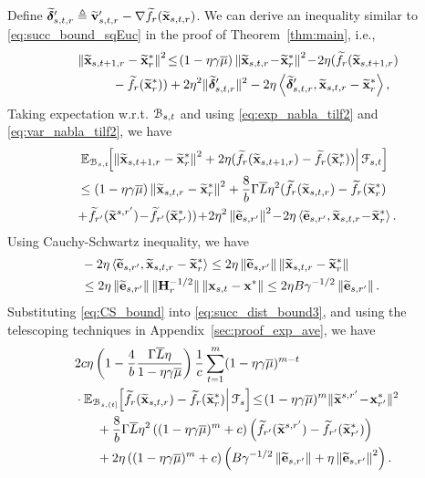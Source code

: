 \documentclass[10pt,twocolumn,journal]{IEEEtran}
\begin{document}
Define $\widetilde{\bm{\delta}}'_{s,t,r} \triangleq \widetilde{\mathbf{v}}'_{s,t,r}-\nabla \widetilde{f}_r (\widetilde{\mathbf{x}}_{s,t,r})$. We can derive an inequality similar to \eqref{eq:succ_bound_sqEuc} in the proof of Theorem~\ref{thm:main}, i.e., 
\begin{align*}
&\left\Vert\widetilde{\mathbf{x}}_{s,t+1,r}-\widetilde{\mathbf{x}}_r^*\right\Vert^2 \!\le\! (1-\eta\gamma\overline{\mu})\left\Vert\widetilde{\mathbf{x}}_{s,t,r} \!-\! \widetilde{\mathbf{x}}_r^*\right\Vert^2 \!-\! 2\eta(\widetilde{f}_r (\widetilde{\mathbf{x}}_{s,t+1,r})\nonumber\\
&\hspace{1cm}-\widetilde{f}_r (\widetilde{\mathbf{x}}_{r}^*))+ {2\eta^2} \Vert\widetilde{\bm{\delta}}'_{s,t,r}\Vert^2 -2\eta\left\langle{\widetilde{\bm{\delta}}'_{s,t,r}},{\widetilde{\mathbf{x}}_{s,t,r}-\widetilde{\mathbf{x}}_r^*}\right\rangle,
\end{align*}
Taking expectation w.r.t. $\mathcal{B}_{s,t}$ and using \eqref{eq:exp_nabla_tilf2} and \eqref{eq:var_nabla_tilf2}, we have
\begin{align}
&\left.\bbE_{\calB_{s,t}}\!\!\left[\norm{\tilbx_{s,t+1,r}-\tilbx_r^*}^2+2\eta(\tilf_r (\tilbx_{s,t+1,r})-\tilf_r (\tilbx_{r}^*))\right\vert\calF_{s,t}\right]\nn\\
&\le(1-\eta\gamma\barmu)\norm{\tilbx_{s,t,r} - \tilbx_r^*}^2 +\frac{8}{b}\Gamma\barL\eta^2(\tilf_r(\tilbx_{s,t,r})-\tilf_r(\tilbx_r^*)\nn\\
&\!+\!\tilf_{r'}(\tilbx^{s,{r'}})\!-\!\tilf_{r'}(\tilbx_{r'}^*)) \!+\! 2\eta^2\norm{\tilbe_{s,r'}}^2 \!-\!2\eta\lrangle{\tilbe_{s,r'}}{\tilbx_{s,t,r}\!-\!\tilbx_r^*}.  \label{eq:succ_dist_bound3}
\end{align}
Using Cauchy-Schwartz inequality, we have 
\begin{align}
&\hspace{-.35cm}-2\eta\lrangle{\tilbe_{s,r'}}{\tilbx_{s,t,r}-\tilbx_r^*}\le 2\eta\norm{\tilbe_{s,r'}}\norm{\tilbx_{s,t,r}-\tilbx_r^*}\nn\\
&\hspace{-.35cm}\le 2\eta\norm{\tilbe_{s,r'}}\normt{\bH_r^{-1/2}}\norm{\bx_{s,t}-\bx^*}\le 2\eta B\gamma^{-1/2} \norm{\tilbe_{s,r'}}. \label{eq:CS_bound}
\end{align} 
Substituting \eqref{eq:CS_bound} into \eqref{eq:succ_dist_bound3}, and using the telescoping techniques in Appendix~\ref{sec:proof_exp_ave}, we have
\begin{align}
&2c\eta\left(1-\frac{4}{b}\frac{\Gamma\barL\eta}{1-\eta\gamma\barmu}\right)\frac{1}{c}\sum_{t=1}^m(1-\eta\gamma\barmu)^{m-t}\nn\\
&\cdot\bbE_{\calB_{s,(t]}}\!\!\left.\left[\tilf_r(\tilbx_{s,t,r})-\tilf_r(\tilbx^*_{r})\right\vert\calF_{s}\right]\!\le\!(1-\eta\gamma\barmu)^{m}\normt{\tilbx^{s,r'}\!-\!\bx_{r'}^*}^2\nn\\
&\hspace{.6cm}+\frac{8}{b}\Gamma\barL\eta^2\left((1-\eta\gamma\barmu)^{m}+c\right)\left(\tilf_{r'}(\tilbx^{s,r'})-\tilf_{r'}(\tilbx_{r'}^*)\right)\nn\\
&\hspace{.6cm} + 2\eta\left((1-\eta\gamma\barmu)^{m}+c\right)\left(B\gamma^{-1/2} \norm{\tilbe_{s,r'}}+\eta\norm{\tilbe_{s,r'}}^2\right).\nn%
\end{align}
\end{document}
